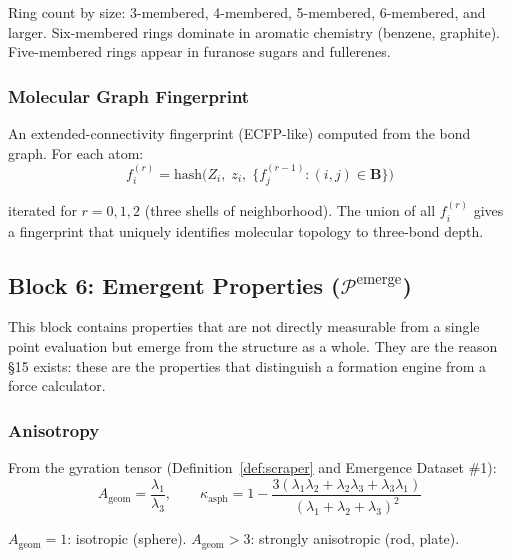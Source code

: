 \documentclass[11pt, a4paper, oneside]{article}
\theoremstyle{definition}
\theoremstyle{remark}
\begin{document}
Ring count by size: 3-membered, 4-membered, 5-membered, 6-membered,
and larger.  Six-membered rings dominate in aromatic chemistry
(benzene, graphite).  Five-membered rings appear in furanose sugars and
fullerenes.

\subsubsection{Molecular Graph Fingerprint}

An extended-connectivity fingerprint (ECFP-like) computed from the bond
graph.  For each atom:
\begin{equation}
f_i^{(r)} = \text{hash}\bigl(Z_i,\; z_i,\; \{f_j^{(r-1)} : (i,j) \in \mathbf{B}\}\bigr)
\end{equation}

iterated for $r = 0, 1, 2$ (three shells of neighborhood).  The union
of all $f_i^{(r)}$ gives a fingerprint that uniquely identifies
molecular topology to three-bond depth.

\subsection{Block 6: Emergent Properties ($\mathcal{P}^{\text{emerge}}$)}
\label{sec:block-emerge}

This block contains properties that are not directly measurable from a
single point evaluation but emerge from the structure as a whole.  They
are the reason §15 exists: these are the properties that distinguish a
formation engine from a force calculator.

\subsubsection{Anisotropy}

From the gyration tensor (Definition~\ref{def:scraper} and
Emergence Dataset \#1):
\begin{equation}
A_{\text{geom}} = \frac{\lambda_1}{\lambda_3},
\qquad
\kappa_{\text{asph}} = 1 - \frac{3(\lambda_1\lambda_2 + \lambda_2\lambda_3 + \lambda_3\lambda_1)}{(\lambda_1 + \lambda_2 + \lambda_3)^2}
\end{equation}

$A_{\text{geom}} = 1$: isotropic (sphere).
$A_{\text{geom}} > 3$: strongly anisotropic (rod, plate).
\end{document}
